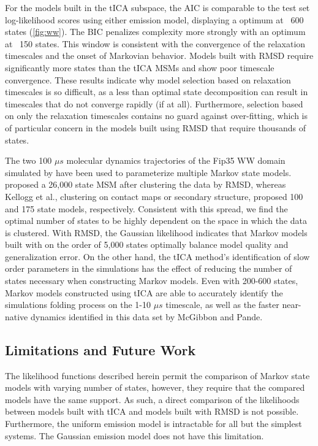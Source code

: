 \documentclass[journal=jpcbfk, layout=traditional, manuscript=article]{achemso}
\begin{document}
For the models built in the tICA subspace, the AIC is comparable to the test set log-likelihood scores using either emission model, displaying a optimum at ~600 states (\cref{fig:ww}). The BIC penalizes complexity more strongly with an optimum at ~150 states. This window is consistent with the convergence of the relaxation timescales and the onset of Markovian behavior. Models built with RMSD require significantly more states than the tICA MSMs and show poor timescale convergence. These results indicate why model selection based on relaxation timescales is so difficult, as a less than optimal state decomposition can result in timescales that do not converge rapidly (if at all). Furthermore, selection based on only the relaxation timescales contains no guard against over-fitting, which is of particular concern in the models built using RMSD that require thousands of states.

The two 100 $\mu s$ molecular dynamics trajectories of the Fip35 WW domain simulated by \citet{Shaw2010Atomic} have been used to parameterize multiple Markov state models. \citet{Lane2011Markov} proposed a 26,000 state MSM after clustering the data by RMSD, whereas Kellogg et al.,\cite{Kellogg2012Evaluation} clustering on contact maps or secondary structure, proposed 100 and 175 state models, respectively. Consistent with this spread, we find the optimal number of states to be highly dependent on the space in which the data is clustered. With RMSD, the Gaussian likelihood indicates that Markov models built with on the order of 5,000 states optimally balance model quality and generalization error. On the other hand, the tICA method's identification of slow order parameters in the simulations has the effect of reducing the number of states necessary when constructing Markov models. Even with 200-600 states, Markov models constructed using tICA are able to accurately identify the simulations folding process on the 1-10 $\mu s$ timescale, as well as the faster near-native dynamics identified in this data set by McGibbon and Pande\cite{McGibbon2013Learning}.

\subsection{Limitations and Future Work}

The likelihood functions described herein permit the comparison of Markov state models with varying number of states, however, they require that the compared models have the same support. As such, a direct comparison of the likelihoods between models built with tICA and models built with RMSD is not possible. Furthermore, the uniform emission model is intractable for all but the simplest systems. The Gaussian emission model does not have this limitation.
\end{document}
